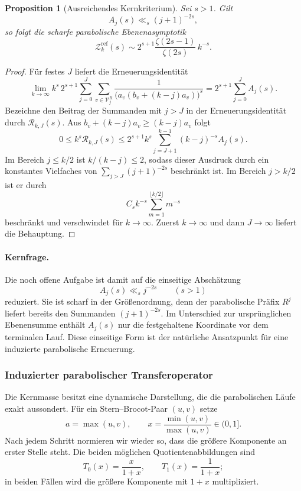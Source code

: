 \documentclass[11pt,a4paper]{article}
\newtheorem{proposition}[remark]{Proposition}
\begin{document}
\begin{proposition}[Ausreichendes Kernkriterium]
Sei $s>1$. Gilt
\[
 A_j(s)\ll_s (j+1)^{-2s},
\]
so folgt die scharfe parabolische Ebenenasymptotik
\[
 \mathcal Z_k^{\mathrm{ref}}(s)
 \sim
 2^{s+1}\frac{\zeta(2s-1)}{\zeta(2s)}\,k^{-s}.
\]
\end{proposition}

\begin{proof}
Für festes $J$ liefert die Erneuerungsidentität
\[
 \lim_{k\to\infty}
 k^s\,2^{s+1}\sum_{j=0}^{J}
 \sum_{v\in\mathcal V_j^R}
 \frac{1}{\bigl(a_v(b_v+(k-j)a_v)\bigr)^s}
 =
 2^{s+1}\sum_{j=0}^{J}A_j(s).
\]
Bezeichne den Beitrag der Summanden mit $j>J$ in der
Erneuerungsidentität durch $\mathcal R_{k,J}(s)$. Aus
$b_v+(k-j)a_v\ge(k-j)a_v$ folgt
\[
 0\le k^s\mathcal R_{k,J}(s)
 \le
 2^{s+1}k^s
 \sum_{j=J+1}^{k-1}(k-j)^{-s}A_j(s).
\]
Im Bereich $j\le k/2$ ist $k/(k-j)\le2$, sodass dieser Ausdruck durch
ein konstantes Vielfaches von
$\sum_{j>J}(j+1)^{-2s}$ beschränkt ist. Im Bereich $j>k/2$ ist er
durch
\[
 C_s k^{-s}\sum_{m=1}^{\lfloor k/2\rfloor}m^{-s}
\]
beschränkt und verschwindet für $k\to\infty$. Zuerst
$k\to\infty$ und dann $J\to\infty$ liefert die Behauptung.
\end{proof}

\paragraph{Kernfrage.}
Die noch offene Aufgabe ist damit auf die einseitige Abschätzung
\[
 A_j(s)\ll_s j^{-2s}
 \qquad(s>1)
\]
reduziert. Sie ist scharf in der Größenordnung, denn der parabolische
Präfix $R^j$ liefert bereits den Summanden $(j+1)^{-2s}$. Im Unterschied
zur ursprünglichen Ebenensumme enthält $A_j(s)$ nur die festgehaltene
Koordinate vor dem terminalen Lauf. Diese einseitige Form ist der
natürliche Ansatzpunkt für eine induzierte parabolische Erneuerung.


\subsubsection{Induzierter parabolischer Transferoperator}

Die Kernmasse besitzt eine dynamische Darstellung, die die parabolischen
Läufe exakt aussondert. Für ein Stern--Brocot-Paar $(u,v)$ setze
\[
 a=\max(u,v),\qquad x=\frac{\min(u,v)}{\max(u,v)}\in(0,1].
\]
Nach jedem Schritt normieren wir wieder so, dass die größere Komponente
an erster Stelle steht. Die beiden möglichen Quotientenabbildungen sind
\[
 T_0(x)=\frac{x}{1+x},
 \qquad
 T_1(x)=\frac{1}{1+x};
\]
in beiden Fällen wird die größere Komponente mit $1+x$ multipliziert.
\end{document}

